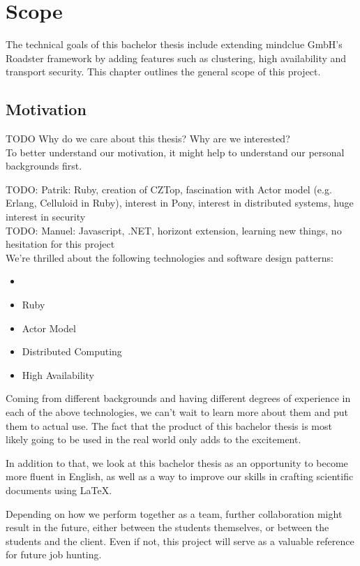 \chapter{Scope}
The technical goals of this bachelor thesis include extending mindclue GmbH's
Roadster framework by adding features such as clustering, high availability and
transport security. This chapter outlines the general scope of this project.

\section{Motivation}
TODO Why do we care about this thesis? Why are we interested?\\

To better understand our motivation, it might help to understand our personal backgrounds first.

TODO: Patrik: Ruby, creation of CZTop, fascination with Actor model (e.g. Erlang, Celluloid in Ruby), interest in Pony, interest in distributed systems, huge interest in security\\
TODO: Manuel: Javascript, .NET, horizont extension, learning new things, no hesitation for this project\\

We're thrilled about the following technologies and software design patterns:

\begin{itemize}
	\item \zmq
	\item Ruby
	\item Actor Model
	\item Distributed Computing
	\item High Availability
\end{itemize}

Coming from different backgrounds and having different degrees of experience in
each of the above technologies, we can't wait to learn more about them and put
them to actual use. The fact that the product of this bachelor thesis is most
likely going to be used in the real world only adds to the excitement.

In addition to that, we look at this bachelor thesis as an opportunity to
become more fluent in English, as well as a way to improve our skills in
crafting scientific documents using {\LaTeX}.

Depending on how we perform together as a team, further collaboration might
result in the future, either between the students themselves, or between the
students and the client. Even if not, this project will serve as a valuable
reference for future job hunting.


